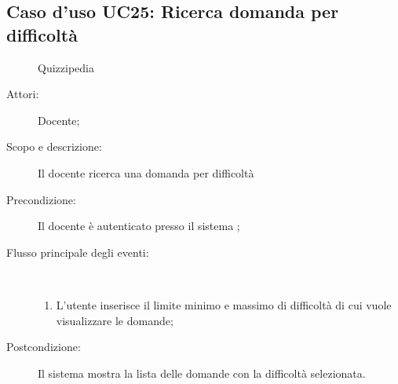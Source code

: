 \subsection{Caso d'uso UC25: Ricerca domanda per difficoltà}
	\begin{figure}[H]
		\centering
		\begin{resizedtikzpicture}{\textwidth}
		\begin{umlsystem}[x=0, fill=lightgray!20]{Quizzipedia}
		\end{umlsystem}
		\end{resizedtikzpicture}
		\caption{}
	\end{figure}
\begin{description}
\item[Attori:] Docente;
\item[Scopo e descrizione:] Il docente ricerca una domanda per difficoltà

      \item[Precondizione:] Il docente è autenticato presso il sistema
;

        \item[Flusso principale degli eventi:] \ 
 \begin{enumerate}
          \item L'utente inserisce il limite minimo e massimo di difficoltà di cui vuole visualizzare le domande;

      \end{enumerate}
    \item[Postcondizione:] Il sistema mostra la lista delle domande con la difficoltà selezionata.
  \end{description}
\hypertarget{UC26}{}
